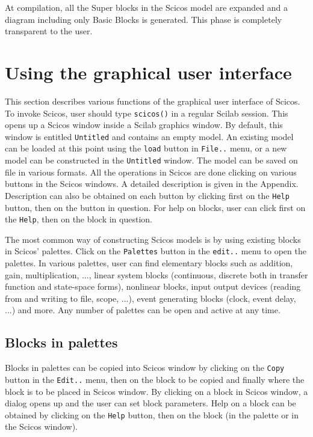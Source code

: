 At compilation, all the Super blocks in the Scicos  model are expanded
and a diagram including only Basic Blocks is generated. This phase is
completely transparent to the user.


\setcounter{equation}{0}
\section{Using the graphical user interface}
\label{tta}
This section describes various functions of the graphical user
interface of Scicos. To invoke Scicos, user should type {\tt scicos()}
in a regular Scilab session. This opens up a 
Scicos   window inside a Scilab graphics window. By default, this window is
entitled {\tt Untitled} and contains an empty model. 
An existing model can be loaded at this point using the {\tt load}
button in {\tt File..} menu, or a new model can
be constructed in the {\tt Untitled} window. The model can be saved on
file in various formats. All the operations in Scicos  are done
clicking on various buttons in the Scicos  windows. A detailed
description is given in the Appendix. Description can also be obtained
on each button by clicking first on the {\tt Help}
button, then on the button in question. For help on blocks, user can click
first on the {\tt Help}, then on the block in question. 

The most common way of constructing Scicos   models is by using existing
blocks in Scicos' palettes. Click on the {\tt Palettes} button in the
{\tt edit..} menu to open
the palettes. In various palettes, user can find elementary blocks such as
addition, gain, multiplication, ..., linear system blocks (continuous,
discrete both in transfer function and state-space forms), nonlinear
blocks, input output devices (reading from and writing to file, scope,
...), event generating blocks (clock, event delay, ...) and more. Any
number of palettes can be open and active at any time.


\subsection{Blocks in palettes}
Blocks in palettes can be copied into Scicos  window by clicking on the
{\tt Copy} button in the {\tt Edit..} menu, then on the block to be copied
and finally where the 
block is to be placed in Scicos   window. By clicking on a block in
Scicos   window, a dialog opens up and the user can set block parameters. 
Help on a block can be obtained by clicking on the {\tt Help} button,
then on the block (in the palette or in the Scicos   window).

